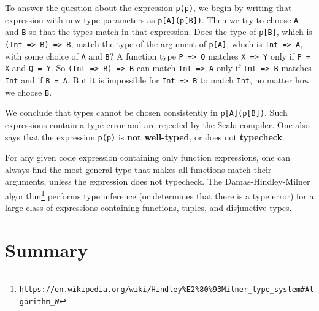 To answer the question about the expression \lstinline!p(p)!, we
begin by writing that expression with new type parameters as \lstinline!p[A](p[B])!.
Then we try to choose \lstinline!A! and \lstinline!B! so that the
types match in that expression. Does the type of \lstinline!p[B]!,
which is \lstinline!(Int => B) => B!, match the type of the argument
of \lstinline!p[A]!, which is \lstinline!Int => A!, with some choice
of \lstinline!A! and \lstinline!B!? A function type \lstinline!P => Q!
matches \lstinline!X => Y! only if \lstinline!P = X! and \lstinline!Q = Y!.
So \lstinline!(Int => B) => B! can match \lstinline!Int => A! only
if \lstinline!Int => B! matches \lstinline!Int! and if \lstinline!B = A!.
But it is impossible for \lstinline!Int => B! to match \lstinline!Int!,
no matter how we choose \lstinline!B!. 

We conclude that types cannot be chosen consistently in \lstinline!p[A](p[B])!.
Such expressions contain a type error and are rejected by the Scala
compiler. One also says that the expression \lstinline!p(p)! is \textbf{not
well-typed}, or does not \textbf{typecheck}.

For any given code expression containing only function expressions,
one can always find the most general type that makes all functions
match their arguments, unless the expression does not typecheck. The
Damas-Hindley-Milner algorithm\footnote{\texttt{\href{https://en.wikipedia.org/wiki/Hindley\%E2\%80\%93Milner_type_system\#Algorithm_W}{https://en.wikipedia.org/wiki/Hindley\%E2\%80\%93Milner\_type\_system\#Algorithm\_W}}}
performs type inference (or determines that there is a type error)
for a large class of expressions containing functions, tuples, and
disjunctive types.

\section{Summary}

